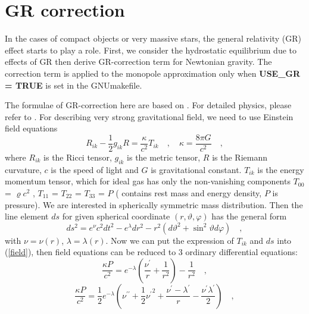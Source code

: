 \section{GR correction}


In the cases of compact objects or very massive stars, the general relativity 
(GR) effect starts to play a role. First, we consider the hydrostatic equilibrium 
due to effects of GR then derive GR-correction term for Newtonian gravity. 
The correction term is applied to the monopole approximation only when 
{\bf USE\_GR  = TRUE} is set in the GNUmakefile. 

The formulae of GR-correction here are based on \cite{grbk1}. For detailed physics,
 please refer to \cite{grbk2}. For describing very strong gravitational field, we need to use Einstein 
field equations
\begin{equation}\label{field}
R_{ik}-\frac{1}{2}g_{ik}R=\frac{\kappa}{c^{2}}T_{ik} \quad , \quad
\kappa=\frac{8\pi G}{c^{2}}\quad ,
\end{equation} 
where $R_{ik}$ is the Ricci tensor, $g_{ik}$ is the metric tensor, $R$ is the Riemann curvature, $c$ is 
the speed of light and $G$ is gravitational constant. $T_{ik}$ is the energy momentum tensor, which for 
ideal gas has only the non-vanishing components $T_{00}$ = $\varrho c^2$ , $T_{11}$ = $T_{22}$ = $T_{33}$ = $P$ 
( contains rest mass and energy density, $P$ is pressure). We are interested in spherically symmetric mass 
distribution. Then the line element $ds$ for given spherical coordinate $(r, \vartheta, \varphi)$ has the 
general form
\begin{equation}\label{metric}
  ds^{2} = e^{\nu}c^{2}dt^{2}-e^{\lambda}dr^{2}-r^{2}(d\vartheta^{2}+\sin^{2}
  \vartheta d\varphi) \quad ,
\end{equation} 
with $\nu = \nu(r)$, $\lambda = \lambda(r)$. Now we can put the expression of $T_{ik}$ and $ds$ into (\ref{field}), then field equations can be reduced to 3 ordinary differential equations:
\begin{equation}\label{diff1}
   \frac{\kappa P}{c^{2}} =
   e^{-\lambda}(\frac{\nu^{\prime}}{r}+\frac{1}{r^{2}})-\frac{1}{r^{2}}
   \quad ,
\end{equation}
\begin{equation}\label{diff2}
  \frac{\kappa P}{c^{2}} =
  \frac{1}{2}e^{-\lambda}(\nu^{\prime\prime}+\frac{1}{2}{\nu^{\prime}}^{2}+\frac{\nu^
    {\prime}-\lambda^{\prime}}{r}
   -\frac{\nu^{\prime}\lambda^{\prime}}{2}) \quad ,
\end{equation}

